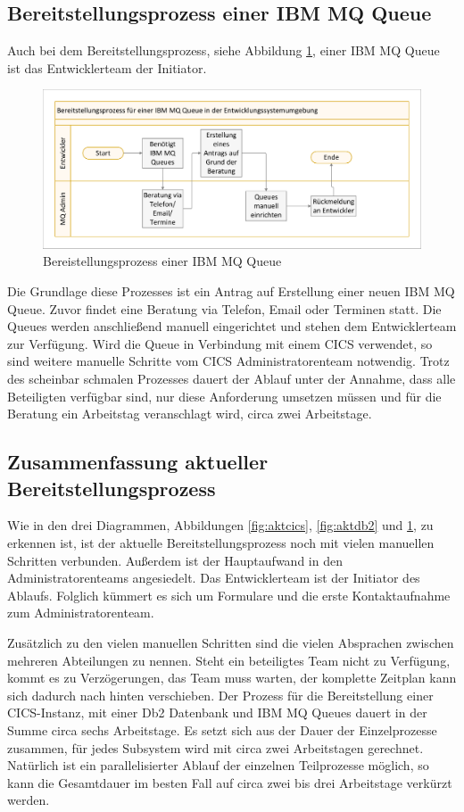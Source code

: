 \subsection{Bereitstellungsprozess einer IBM MQ Queue}
Auch bei dem Bereitstellungsprozess, siehe Abbildung \ref{fig:aktmq}, einer IBM MQ Queue ist das Entwicklerteam der Initiator.

\begin{figure}[ht!]
\centering
\includegraphics[width=\paperwidth,angle=90]{figures/swimlaneMQ.pdf}
\caption{Bereistellungsprozess einer IBM MQ Queue}
\label{fig:aktmq}
\end{figure}

Die Grundlage diese Prozesses ist ein Antrag auf Erstellung einer neuen IBM MQ Queue.
Zuvor findet eine Beratung via Telefon, Email oder Terminen statt.
Die Queues werden anschließend manuell eingerichtet und stehen dem Entwicklerteam zur Verfügung.
Wird die Queue in Verbindung mit einem CICS verwendet, so sind weitere manuelle Schritte vom CICS Administratorenteam notwendig.
Trotz des scheinbar schmalen Prozesses dauert der Ablauf unter der Annahme, dass alle Beteiligten verfügbar sind, nur diese Anforderung umsetzen müssen und für die Beratung ein Arbeitstag veranschlagt wird, circa zwei Arbeitstage.

\subsection{Zusammenfassung aktueller Bereitstellungsprozess}\label{ssec:sumaktbereit}
Wie in den drei Diagrammen, Abbildungen \ref{fig:aktcics}, \ref{fig:aktdb2} und \ref{fig:aktmq}, zu erkennen ist, ist der aktuelle Bereitstellungsprozess noch mit vielen manuellen Schritten verbunden.
Außerdem ist der Hauptaufwand in den Administratorenteams angesiedelt.
Das Entwicklerteam ist der Initiator des Ablaufs.
Folglich kümmert es sich um Formulare und die erste Kontaktaufnahme zum Administratorenteam.

Zusätzlich zu den vielen manuellen Schritten sind die vielen Absprachen zwischen mehreren Abteilungen zu nennen.
Steht ein beteiligtes Team nicht zu Verfügung, kommt es zu Verzögerungen, das Team muss warten, der komplette Zeitplan kann sich dadurch nach hinten verschieben.
Der Prozess für die Bereitstellung einer CICS-Instanz, mit einer Db2 Datenbank und IBM MQ Queues dauert in der Summe circa sechs Arbeitstage.
Es setzt sich aus der Dauer der Einzelprozesse zusammen, für jedes Subsystem wird mit circa zwei Arbeitstagen gerechnet.
Natürlich ist ein parallelisierter Ablauf der einzelnen Teilprozesse möglich, so kann die Gesamtdauer im besten Fall auf circa zwei bis drei Arbeitstage verkürzt werden.

